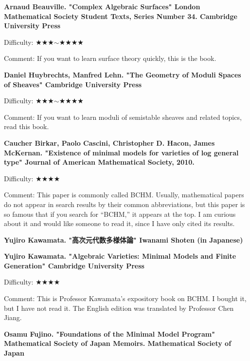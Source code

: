 \textbf{Arnaud Beauville. "Complex Algebraic Surfaces" London Mathematical Society Student Texts, Series Number 34. Cambridge University Press} \vspace{-6pt}

Difficulty: ★★★$\sim$★★★★\vspace{-6pt} 

Comment: If you want to learn surface theory quickly, this is the book.
\vspace{8pt}

\textbf{Daniel Huybrechts, Manfred Lehn. "The Geometry of Moduli Spaces of Sheaves" Cambridge University Press} \vspace{-6pt}

Difficulty: ★★★$\sim$★★★★\vspace{-6pt} 

Comment: If you want to learn moduli of semistable sheaves and related topics, read this book.
 \vspace{8pt}
 
 \textbf{Caucher Birkar, Paolo Cascini, Christopher D. Hacon, James McKernan. "Existence of minimal models for varieties of log general type" Journal of American Mathematical Society, 2010.} \vspace{-6pt}

Difficulty: ★★★★\vspace{-6pt} 

Comment: This paper is commonly called BCHM. Usually, mathematical papers do not appear in search results by their common abbreviations, but this paper is so famous that if you search for ``BCHM,'' it appears at the top. I am curious about it and would like someone to read it, since I have only cited its results.
\vspace{8pt}

\textbf{Yujiro Kawamata. "高次元代数多様体論" Iwanami Shoten (in Japanese)} \vspace{-6pt}

\textbf{Yujiro Kawamata. "Algebraic Varieties: Minimal Models and Finite Generation" Cambridge University Press} \vspace{-6pt}

Difficulty: ★★★★\vspace{-6pt} 

Comment: This is Professor Kawamata's expository book on BCHM. I bought it, but I have not read it. The English edition was translated by Professor Chen Jiang.
\vspace{8pt}

\textbf{Osamu Fujino. "Foundations of the Minimal Model Program" Mathematical Society of Japan Memoirs. Mathematical Society of Japan} \vspace{-6pt}

